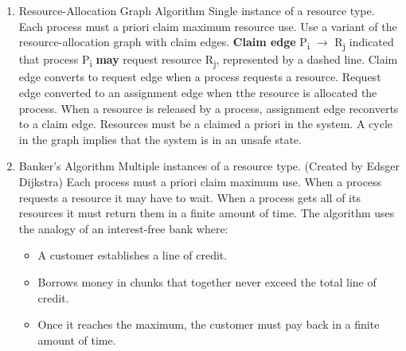 \documentclass[11pt]{article}
\begin{document}
\begin{enumerate}
\item Resource-Allocation Graph Algorithm
\label{sec:org17d9637}
Single instance of a resource type.
Each process must a priori claim maximum resource use.
Use a variant of the resource-allocation graph with claim edges.
\textbf{Claim edge} P\textsubscript{i} \(\rightarrow\) R\textsubscript{j} indicated that process P\textsubscript{i} \textbf{may} request resource R\textsubscript{j}, represented by a dashed line.
Claim edge converts to request edge when a process requests a resource.
Request edge converted to an assignment edge when tthe resource is allocated the process.
When a resource is released by a process, assignment edge reconverts to a claim edge.
Resources must be a claimed a priori in the system.
A cycle in the graph implies that the system is in an unsafe state.

\item Banker's Algorithm
\label{sec:org895e8a5}
Multiple instances of a resource type.
(Created by Edsger Dijkstra)
Each process must a priori claim maximum use.
When a process requests a resource it may have to wait.
When a process gets all of its resources it must return them in a finite amount of time.
The algorithm uses the analogy of an interest-free bank where:
\begin{itemize}
\item A customer establishes a line of credit.
\item Borrows money in chunks that together never exceed the total line of credit.
\item Once it reaches the maximum, the customer must pay back in a finite amount of time.
\end{itemize}


\end{enumerate}
\end{document}
